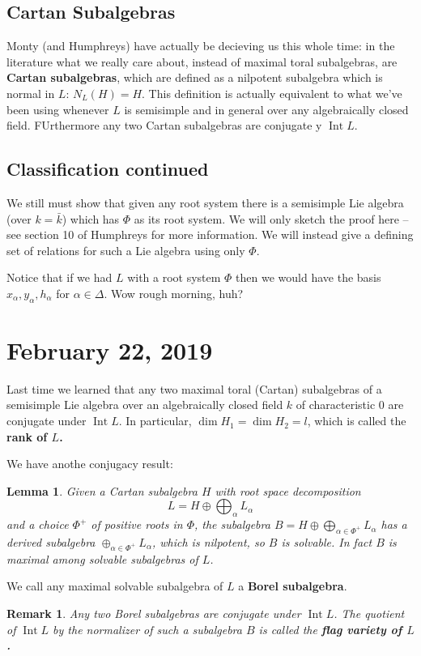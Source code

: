 \documentclass[12pt]{article}
\theoremstyle{nonumberbreak}
\theoremstyle{changebreak}
\newtheorem{lem}[thm]{Lemma}
\theoremstyle{nonumberbreak}
\theoremstyle{change}
\newtheorem{rmk}[thm]{Remark}
\DeclareMathOperator{\Int}{Int}
\begin{document}
\subsection{Cartan Subalgebras}
Monty (and Humphreys) have actually be decieving us this whole time: in the literature what we really care about, 
instead of maximal toral subalgebras, are \textbf{Cartan subalgebras}, which are defined as a nilpotent subalgebra
which is normal in $L$: $N_L(H)=H$. This definition is actually equivalent to what we've been using
whenever $L$ is semisimple and in general over any algebraically closed field. FUrthermore any two Cartan subalgebras are
conjugate y $\Int L$.

\subsection{Classification continued}
We still must show that given any root system there is a semisimple Lie algebra (over $k=\bar k$)
which has $\Phi$ as its root system. We will only sketch the proof here -- see section 10 of Humphreys for more
information. We will instead give a defining set of relations for such a Lie algebra using only $\Phi$.

Notice that if we had $L$ with a root system $\Phi$ then we would have the basis $x_\alpha,y_\alpha,h_\alpha$ for $\alpha\in\Delta$.
Wow rough morning, huh?

\section{February 22, 2019}
Last time we learned that any two maximal toral (Cartan) subalgebras  of a semisimple Lie algebra over an algebraically closed field $k$ 
of characteristic 0 are conjugate under $\Int L$. In particular, $\dim H_1=\dim H_2=l$, which is called the \textbf{rank of $L$.}

We have anothe conjugacy result:
\begin{lem}
	Given a Cartan subalgebra $H$ with root space decomposition
	\[L=H\oplus\bigoplus_\alpha L_\alpha\]
	and a choice $\Phi^+$ of positive roots in $\Phi$, the subalgebra $B=H\oplus\bigoplus_{\alpha\in\Phi^+}L_\alpha$
	has a derived subalgebra $\oplus_{\alpha\in \Phi^+}L_\alpha$, which is nilpotent, so $B$ is solvable. In fact
	$B$ is maximal among solvable subalgebras of $L$.
\end{lem}

\begin{defn}
	We call any maximal solvable subalgebra of $L$ a \textbf{Borel subalgebra}.
\end{defn}
\begin{rmk}
	Any two Borel subalgebras are conjugate under $\Int L$. The quotient of $\Int L$ by the normalizer of such a subalgebra $B$ is called the \textbf{flag variety of $L$.}
\end{rmk}
\end{document}
